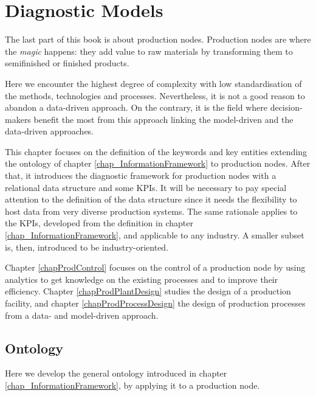 \chapter{Diagnostic Models}

The last part of this book is about production nodes. Production nodes are where the \textit{magic} happens: they add value to raw materials by transforming them to semifinished or finished products. \par

Here we encounter the highest degree of complexity with low standardisation of the methods, technologies and processes. Nevertheless, it is not a good reason to abandon a data-driven approach.  On the contrary, it is the field where decision-makers benefit the most from this approach linking the model-driven and the data-driven approaches.\par

This chapter focuses on the definition of the keywords and key entities extending the ontology of chapter \ref{chap_InformationFramework} to production nodes. After that, it introduces the diagnostic framework for production nodes with a relational data structure and some KPIs. It will be necessary to pay special attention to the definition of the data structure since it needs the flexibility to host data from very diverse production systems. The same rationale applies to the KPIs, developed from the definition in chapter \ref{chap_InformationFramework}, and applicable to any industry. A smaller subset is, then, introduced to be industry-oriented.\par

Chapter \ref{chapProdControl} focuses on the control of a production node by using analytics to get knowledge on the existing processes and to improve their efficiency. Chapter \ref{chapProdPlantDesign} studies the design of a production facility, and chapter \ref{chapProdProcessDesign} the design of production processes from a data- and model-driven approach.

\section{Ontology}
Here we develop the general ontology introduced in chapter \ref{chap_InformationFramework}, by applying it to a production node. 

